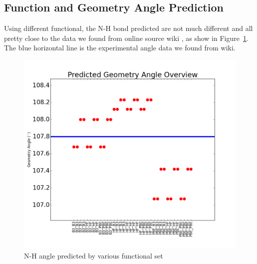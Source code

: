 \documentclass{article}
\begin{document}
\subsection{Function and Geometry Angle Prediction}
Using different functional, the N-H bond predicted are not much different and all pretty close to the data we found from online source wiki \cite{Wiki}, as show in Figure~\ref{fig:Geometry}. The blue horizontal line is the experimental angle data we found from wiki. 
\begin{figure}[ht]
\includegraphics[width=1\textwidth]{Geometry.png}
\caption{N-H angle predicted by various functional set}
\label{fig:Geometry}
\end{figure}
\end{document}
